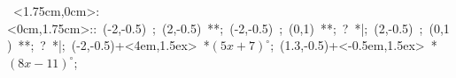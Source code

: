 \hbox{
\xy    <1.75cm,0cm>:<0cm,1.75cm>::
       (-2,-0.5) ; (2,-0.5) **\dir{-};  
       (-2,-0.5) ; (0,1) **\dir{-}; ? *{|};
       (2,-0.5) ; (0,1) **\dir{-}; ? *{|};
       (-2,-0.5)+<4em,1.5ex> *{\hbox{$(5x+7)^{\circ}$}};
       (1.3,-0.5)+<-0.5em,1.5ex> *{\hbox{$(8x-11)^{\circ}$}};
       \endxy}
